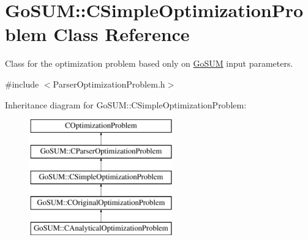 \hypertarget{class_go_s_u_m_1_1_c_simple_optimization_problem}{\section{Go\-S\-U\-M\-:\-:C\-Simple\-Optimization\-Problem Class Reference}
\label{class_go_s_u_m_1_1_c_simple_optimization_problem}
}


Class for the optimization problem based only on \hyperlink{struct_go_s_u_m}{Go\-S\-U\-M} input parameters.  




{\ttfamily \#include $<$Parser\-Optimization\-Problem.\-h$>$}

Inheritance diagram for Go\-S\-U\-M\-:\-:C\-Simple\-Optimization\-Problem\-:\begin{figure}[H]
\begin{center}
\leavevmode
\includegraphics[height=5.000000cm]{class_go_s_u_m_1_1_c_simple_optimization_problem}
\end{center}
\end{figure}
